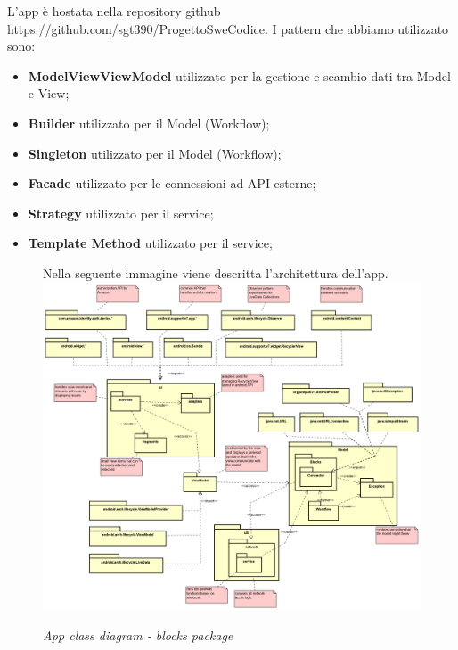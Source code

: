 L'app è hostata nella repository github https://github.com/sgt390/ProgettoSweCodice.
I pattern che abbiamo utilizzato sono:
\begin{itemize}
	\item \textbf{ModelViewViewModel} utilizzato per la gestione e scambio dati tra Model e View;
	\item \textbf{Builder} utilizzato per il Model (Workflow);
	\item \textbf{Singleton} utilizzato per il Model (Workflow);
	\item \textbf{Facade} utilizzato per le connessioni ad API esterne;
	\item \textbf{Strategy} utilizzato per il service;
	\item \textbf{Template Method} utilizzato per il service;
\end{itemize}
\clearpage
\begin{figure} [H]
Nella seguente immagine viene descritta l'architettura dell'app.
	\centering
	\includegraphics[scale=0.3]{./images/Package.png}
	\caption{\textit{App class diagram - blocks package}}\label{Package}
\end{figure}

